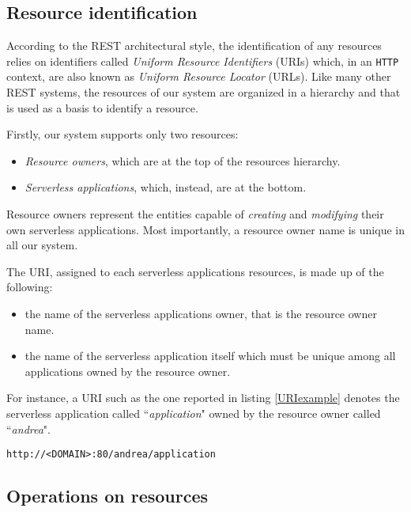 \documentclass[12pt,a4paper]{report}
\newcommand{\ItalicQuotMark}[1]{``\textit{#1}"}
\begin{document}
\subsection{Resource identification}

According to the REST architectural style, the identification of any resources relies on identifiers called \textit{Uniform Resource Identifiers} (URIs) which, in an \texttt{HTTP} context, are also known as \textit{Uniform Resource Locator} (URLs). Like many other REST systems, the resources of our system are organized in a hierarchy and that is used as a basis to identify a resource.

Firstly, our system supports only two resources:

\begin{itemize}
	\item \textit{Resource owners}, which are at the top of the resources hierarchy.
	
	\item \textit{Serverless applications}, which, instead, are at the bottom.
\end{itemize}

Resource owners represent the entities capable of \textit{creating} and \textit{modifying} their own serverless applications. Most importantly, a resource owner name is unique in all our system.

The URI, assigned to each serverless applications resources, is made up of the following:

\begin{itemize}
	\item the name of the serverless applications owner, that is the resource owner name.
	\item the name of the serverless application itself which must be unique among all applications owned by the resource owner.
\end{itemize}

For instance, a URI such as the one reported in listing \ref{URIexample} denotes the serverless application called \ItalicQuotMark{application} owned by the resource owner called \ItalicQuotMark{andrea}.

\begin{lstlisting}[frame=lines, caption={A serverless application URI example}, label={URIexample}]
http://<DOMAIN>:80/andrea/application
\end{lstlisting}

\subsection{Operations on resources}
\end{document}

